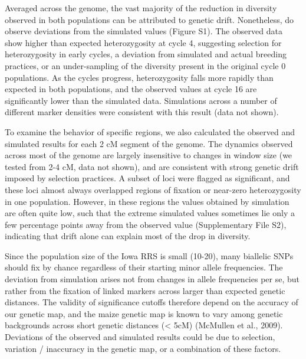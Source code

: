 Averaged across the genome, the vast majority of the reduction in diversity observed in both populations can be attributed to genetic drift. 
Nonetheless, do observe deviations from the simulated values (Figure S1). 
The observed data show higher than expected heterozygosity at cycle 4, suggesting selection for heterozygosity in early cycles, a deviation from simulated and actual breeding practices, or an under-sampling of the diversity present in the original cycle 0 populations. 
As the cycles progress, heterozygosity falls more rapidly than expected in both populations, and the observed values at cycle 16 are significantly lower than the simulated data.  
Simulations across a number of different marker densities were consistent with this result (data not shown). 

To examine the behavior of specific regions, we also calculated the observed and simulated results for each 2 cM segment of the genome. 
The dynamics observed across most of the genome are largely insensitive to changes in window size (we tested from 2-4 cM, data not shown), and are consistent with strong genetic drift imposed by selection practices. 
A subset of loci were flagged as significant, and these loci almost always overlapped regions of fixation or near-zero heterozygosity in one population. 
However, in these regions the values obtained by simulation are often quite low, such that the extreme simulated values sometimes lie only a few percentage points away from the observed value (Supplementary File S2), indicating that drift alone can explain most of the drop in diversity. 

Since the population size of the Iowa RRS is small (10-20), many biallelic SNPs should fix by chance regardless of their starting minor allele frequencies. The deviation from simulation arises not from changes in allele frequencies per se, but rather from the fixation of linked markers across larger than expected genetic distances. 
The validity of significance cutoffs therefore depend on the accuracy of our genetic map, and the maize genetic map is known to vary among genetic backgrounds across short genetic distances (< 5cM) (McMullen et al., 2009). 
Deviations of the observed and simulated results could be due to selection, variation / inaccuracy in the genetic map, or a combination of these factors. 

